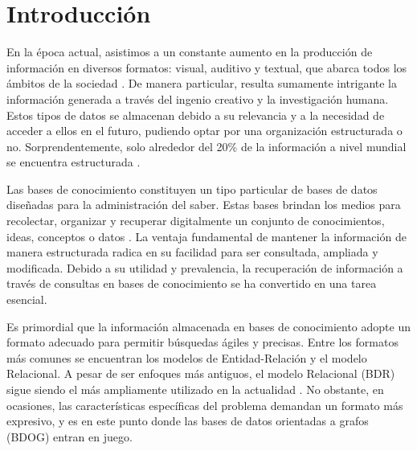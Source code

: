 \chapter*{Introducción}\label{chapter:introduction}

\qquad 

En la época actual, asistimos a un constante aumento en la producción de información en diversos formatos: visual, auditivo y textual, que abarca todos los ámbitos de la sociedad \cite{datagenworld}. De manera particular, resulta sumamente intrigante la información generada a través del ingenio creativo y la investigación humana. Estos tipos de datos se almacenan debido a su relevancia y a la necesidad de acceder a ellos en el futuro, pudiendo optar por una organización estructurada o no. Sorprendentemente, solo alrededor del 20\% de la información a nivel mundial se encuentra estructurada \cite{structdata}.

Las bases de conocimiento constituyen un tipo particular de bases de datos diseñadas para la administración del saber. Estas bases brindan los medios para recolectar, organizar y recuperar digitalmente un conjunto de conocimientos, ideas, conceptos o datos \cite{orgkb}. La ventaja fundamental de mantener la información de manera estructurada radica en su facilidad para ser consultada, ampliada y modificada. Debido a su utilidad y prevalencia, la recuperación de información a través de consultas en bases de conocimiento se ha convertido en una tarea esencial.

Es primordial que la información almacenada en bases de conocimiento adopte un formato adecuado para permitir búsquedas ágiles y precisas. Entre los formatos más comunes se encuentran los modelos de Entidad-Relación y el modelo Relacional. A pesar de ser enfoques más antiguos, el modelo Relacional (BDR) sigue siendo el más ampliamente utilizado en la actualidad \cite{datamodel}. No obstante, en ocasiones, las características específicas del problema demandan un formato más expresivo, y es en este punto donde las bases de datos orientadas a grafos (BDOG) \cite{graphdbs} entran en juego.


